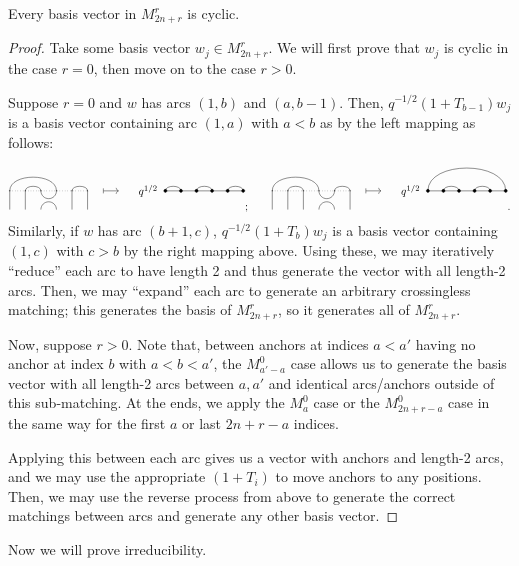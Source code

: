 \documentclass{amsart}
\begin{document}
\begin{lemma}
  \label{Cyclic}
  Every basis vector in $M_{2n + r}^r$ is cyclic.
\end{lemma}
\begin{proof}
  Take some basis vector $w_j \in M_{2n + r}^r$.
  We will first prove that $w_j$ is cyclic in the case $r = 0$, then move on to the case $r > 0$.

  Suppose $r = 0$ and $w$ has arcs $(1,b)$ and $(a,b-1)$.
  Then, $q^{-1/2}(1 + T_{b-1})w_j$ is a basis vector containing arc $(1,a)$ with $a < b$ as by the left mapping as follows:
  \[
    \Action{6}{1/4, 2/3, 5/6}{3}{1/2, 3/4, 5/6}{q^{1/2}}; \hspace{20pt} 
    \Action{6}{1/4, 2/3, 5/6}{4}{1/6, 2/3, 4/5}{q^{1/2}}. 
  \]
  Similarly, if $w$ has arc $(b+1,c)$, $q^{-1/2}(1 + T_b)w_j$ is a basis vector containing $(1,c)$ with $c > b$ by the right mapping above.
  Using these, we may iteratively ``reduce'' each arc to have length 2 and thus generate the vector with all length-2 arcs.
  Then, we may ``expand'' each arc to generate an arbitrary crossingless matching;
  this generates the basis of $M_{2n + r}^r$, so it generates all of $M_{2n + r}^r$.

  Now, suppose $r > 0$.
  Note that, between anchors at indices $a<a'$ having no anchor at index $b$ with $a < b < a'$, the $M_{a'-a}^0$ case allows us to generate the basis vector with all length-2 arcs between $a,a'$ and identical arcs/anchors outside of this sub-matching.
  At the ends, we apply the $M_a^0$ case or the $M_{2n + r - a}^{0}$ case in the same way for the first $a$ or last $2n + r - a$ indices.

  Applying this between each arc gives us a vector with anchors and length-2 arcs, and we may use the appropriate $(1+T_i)$ to move anchors to any positions.
  Then, we may use the reverse process from above to generate the correct matchings between arcs and generate any other basis vector.
\end{proof}

Now we will prove irreducibility.
\end{document}
